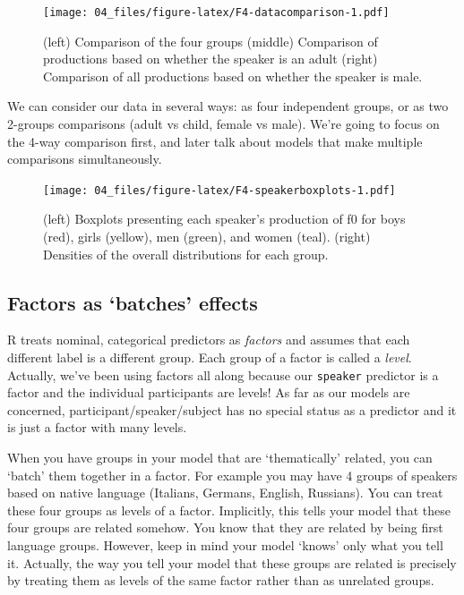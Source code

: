 \documentclass[
]{book}
\begin{document}
\begin{figure}
\centering
\texttt{[image: 04\_files/figure-latex/F4-datacomparison-1.pdf]}
\caption{\label{fig:F4-datacomparison}(left) Comparison of the four groups (middle) Comparison of productions based on whether the speaker is an adult (right) Comparison of all productions based on whether the speaker is male.}
\end{figure}

We can consider our data in several ways: as four independent groups, or as two 2-groups comparisons (adult vs child, female vs male). We're going to focus on the 4-way comparison first, and later talk about models that make multiple comparisons simultaneously.

\begin{figure}
\centering
\texttt{[image: 04\_files/figure-latex/F4-speakerboxplots-1.pdf]}
\caption{\label{fig:F4-speakerboxplots}(left) Boxplots presenting each speaker's production of f0 for boys (red), girls (yellow), men (green), and women (teal). (right) Densities of the overall distributions for each group.}
\end{figure}

\hypertarget{factors-as-batches-effects}{%
\subsection{Factors as `batches' effects}\label{factors-as-batches-effects}}

R treats nominal, categorical predictors as \emph{factors} and assumes that each different label is a different group. Each group of a factor is called a \emph{level}. Actually, we've been using factors all along because our \texttt{speaker} predictor is a factor and the individual participants are levels! As far as our models are concerned, participant/speaker/subject has no special status as a predictor and it is just a factor with many levels.

When you have groups in your model that are `thematically' related, you can `batch' them together in a factor. For example you may have 4 groups of speakers based on native language (Italians, Germans, English, Russians). You can treat these four groups as levels of a factor. Implicitly, this tells your model that these four groups are related somehow. You know that they are related by being first language groups. However, keep in mind your model `knows' only what you tell it. Actually, the way you tell your model that these groups are related is precisely by treating them as levels of the same factor rather than as unrelated groups.
\end{document}

